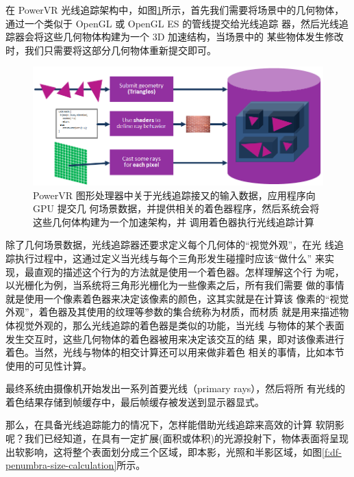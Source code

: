 在 PowerVR 光线追踪架构中，如图\ref{f:df-Ray-tracing-in-games_Ray-tracing-inputs}所示，首先我们需要将场景中的几何物体，通过一个类似于 OpenGL 或 OpenGL ES 的管线提交给光线追踪 器，然后光线追踪器会将这些几何物体构建为一个 3D 加速结构，当场景中的 某些物体发生修改时，我们只需要将这部分几何物体重新提交即可。

\begin{figure}
	\includegraphics[width=\textwidth]{figures/shadows/Ray-tracing-in-games_Ray-tracing-inputs}
	\caption{PowerVR 图形处理器中关于光线追踪接又的输入数据，应用程序向 GPU 提交几 何场景数据，并提供相关的着色器程序，然后系统会将这些几何体构建为一个加速架构，并 调用着色器执行光线追踪计算}
	\label{f:df-Ray-tracing-in-games_Ray-tracing-inputs}
\end{figure}


除了几何场景数据，光线追踪器还要求定义每个几何体的“视觉外观”，在光 线追踪执行过程中，这通过定义当光线与每个三角形发生碰撞时应该“做什么” 来实现，最直观的描述这个行为的方法就是使用一个着色器。怎样理解这个行 为呢，以光栅化为例，当系统将三角形光栅化为一些像素之后，所有我们需要 做的事情就是使用一个像素着色器来决定该像素的颜色，这其实就是在计算该 像素的“视觉外观”，着色器及其使用的纹理等参数的集合统称为材质，而材质 就是用来描述物体视觉外观的，那么光线追踪的着色器是类似的功能，当光线 与物体的某个表面发生交互时，这些几何物体的着色器被用来决定该交互的结 果，即对该像素进行着色。当然，光线与物体的相交计算还可以用来做非着色 相关的事情，比如本节使用的可见性计算。

最终系统由摄像机开始发出一系列首要光线（primary rays），然后将所 有光线的着色结果存储到帧缓存中，最后帧缓存被发送到显示器显式。

那么，在具备光线追踪能力的情况下，怎样能借助光线追踪来高效的计算 软阴影呢？我们已经知道，在具有一定扩展(面积或体积)的光源投射下，物体表面将呈现出软影响，这将整个表面划分成三个区域，即本影，光照和半影区域，如图\ref{f:df-penumbra-size-calculation}所示。

